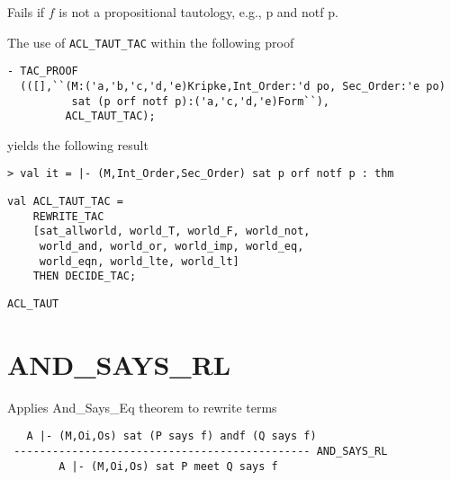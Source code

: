 \FAILURE
Fails if $f$ is not a propositional tautology, e.g., p and notf p.

\EXAMPLE
The use of \texttt{ACL\_TAUT\_TAC} within the following proof
\begin{holboxed}
\begin{verbatim}
- TAC_PROOF 
  (([],``(M:('a,'b,'c,'d,'e)Kripke,Int_Order:'d po, Sec_Order:'e po) 
          sat (p orf notf p):('a,'c,'d,'e)Form``),
         ACL_TAUT_TAC);
\end{verbatim}
\end{holboxed}
yields the following result
\begin{holboxed}
\begin{verbatim}
> val it = |- (M,Int_Order,Sec_Order) sat p orf notf p : thm
\end{verbatim}
\end{holboxed}

\IMPLEMENTATION
\begin{holboxed}
\begin{verbatim}
val ACL_TAUT_TAC =
    REWRITE_TAC 
    [sat_allworld, world_T, world_F, world_not, 
     world_and, world_or, world_imp, world_eq,
     world_eqn, world_lte, world_lt]
    THEN DECIDE_TAC;
\end{verbatim}
\end{holboxed}

\SEEALSO
\texttt{ACL\_TAUT}
\ENDDOC

\section{AND\_SAYS\_RL}



\egroup


\SYNOPSIS
Applies And_Says_Eq theorem to rewrite terms

\DESCRIBE

\begin{verbatim}
   A |- (M,Oi,Os) sat (P says f) andf (Q says f)
 ---------------------------------------------- AND_SAYS_RL
        A |- (M,Oi,Os) sat P meet Q says f
\end{verbatim}


